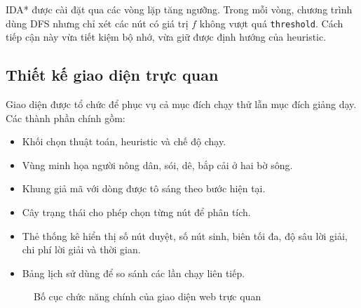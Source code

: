 \documentclass[a4paper,12pt]{article}
\begin{document}
IDA* được cài đặt qua các vòng lặp tăng ngưỡng. Trong mỗi vòng, chương trình dùng DFS nhưng chỉ xét các nút có giá trị \(f\) không vượt quá \texttt{threshold}. Cách tiếp cận này vừa tiết kiệm bộ nhớ, vừa giữ được định hướng của heuristic.

\subsection{Thiết kế giao diện trực quan}

Giao diện được tổ chức để phục vụ cả mục đích chạy thử lẫn mục đích giảng dạy. Các thành phần chính gồm:
\begin{itemize}
    \item Khối chọn thuật toán, heuristic và chế độ chạy.
    \item Vùng minh họa người nông dân, sói, dê, bắp cải ở hai bờ sông.
    \item Khung giả mã với dòng được tô sáng theo bước hiện tại.
    \item Cây trạng thái cho phép chọn từng nút để phân tích.
    \item Thẻ thống kê hiển thị số nút duyệt, số nút sinh, biên tối đa, độ sâu lời giải, chi phí lời giải và thời gian.
    \item Bảng lịch sử dùng để so sánh các lần chạy liên tiếp.
\end{itemize}

\begin{figure}[H]
\centering
{}
\caption{Bố cục chức năng chính của giao diện web trực quan}
\label{fig:ui-layout}
\end{figure}
\end{document}
